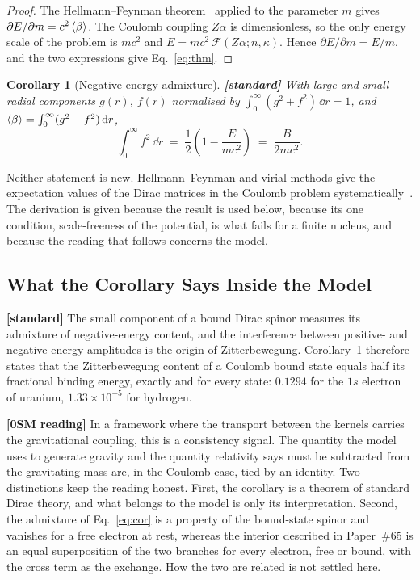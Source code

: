 \documentclass[%
 reprint, amsmath,amssymb, aps, prb, ]{revtex4-2}
\numberwithin{equation}{section}
\newtheorem{corollary}[theorem]{Corollary}
\begin{document}
\begin{proof}
The Hellmann--Feynman theorem~\cite{feynman1939} applied to the parameter $m$ gives $\partial E/\partial m = c^{2}\expval{\beta}$. The Coulomb coupling $Z\alpha$ is dimensionless, so the only energy scale of the problem is $mc^{2}$ and $E = mc^{2}\,\mathcal{F}(Z\alpha;n,\kappa)$. Hence $\partial E/\partial m = E/m$, and the two expressions give Eq.~\eqref{eq:thm}.
\end{proof}

\begin{corollary}[Negative-energy admixture]
\label{cor:admix}
\textbf{[standard]} With large and small radial components $g(r)$, $f(r)$ normalised by $\int_0^\infty (g^{2}+f^{2})\,\dd r = 1$, and $\expval{\beta} = \int_0^\infty (g^{2}-f^{2})\,\dd r$,
\begin{equation}
\int_0^\infty f^{2}\,\dd r \;=\; \frac{1}{2}\left(1 - \frac{E}{mc^{2}}\right) \;=\; \frac{B}{2mc^{2}} .
\label{eq:cor}
\end{equation}
\end{corollary}

Neither statement is new. Hellmann--Feynman and virial methods give the expectation values of the Dirac matrices in the Coulomb problem systematically~\cite{adkins2008}. The derivation is given because the result is used below, because its one condition, scale-freeness of the potential, is what fails for a finite nucleus, and because the reading that follows concerns the model.

\subsection{What the Corollary Says Inside the Model}
\label{subsec:why_theorem}

\textbf{[standard]} The small component of a bound Dirac spinor measures its admixture of negative-energy content, and the interference between positive- and negative-energy amplitudes is the origin of Zitterbewegung. Corollary~\ref{cor:admix} therefore states that the Zitterbewegung content of a Coulomb bound state equals half its fractional binding energy, exactly and for every state: $0.1294$ for the $1s$ electron of uranium, $1.33\times10^{-5}$ for hydrogen.

\textbf{[0SM reading]} In a framework where the transport between the kernels carries the gravitational coupling, this is a consistency signal. The quantity the model uses to generate gravity and the quantity relativity says must be subtracted from the gravitating mass are, in the Coulomb case, tied by an identity. Two distinctions keep the reading honest. First, the corollary is a theorem of standard Dirac theory, and what belongs to the model is only its interpretation. Second, the admixture of Eq.~\eqref{eq:cor} is a property of the bound-state spinor and vanishes for a free electron at rest, whereas the interior described in Paper~\#65 is an equal superposition of the two branches for every electron, free or bound, with the cross term as the exchange. How the two are related is not settled here.
\end{document}
